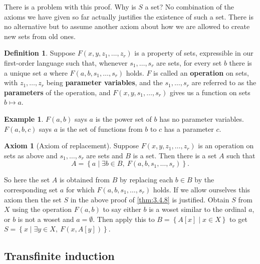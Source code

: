 \documentclass{article}
\newcommand{\rb}[1]{\left( #1 \right)}
\renewcommand{\sb}[1]{\left[ #1 \right]}
\newcommand{\cb}[1]{\left\{ #1 \right\}}
\theoremstyle{definition}\newtheorem{definition}{Definition}[subsection]
\theoremstyle{definition}\newtheorem{remark}[definition]{Remark}
\theoremstyle{definition}\newtheorem*{example}{Example}
\theoremstyle{definition}\newtheorem*{note}{Note}
\newtheorem{axiom}{Axiom}
\begin{document}

There is a problem with this proof. Why is $ S $ a set? No combination of the axioms we have given so far actually justifies the existence of such a set. There is no alternative but to assume another axiom about how we are allowed to create new sets from old ones.

\begin{definition}
Suppose $ F\rb{x, y, z_1, \dots, z_r} $ is a property of sets, expressible in our first-order language such that, whenever $ s_1, \dots, s_r $ are sets, for every set $ b $ there is a unique set $ a $ where $ F\rb{a, b, s_1, \dots, s_r} $ holds. $ F $ is called an \textbf{operation} on sets, with $ z_1, \dots, z_r $ being \textbf{parameter variables}, and the $ s_1, \dots, s_r $ are referred to as the \textbf{parameters} of the operation, and $ F\rb{x, y, s_1, \dots, s_r} $ gives us a function on sets $ b \mapsto a $.
\end{definition}

\begin{example}
$ F\rb{a, b} $ says $ a $ is the power set of $ b $ has no parameter variables. $ F\rb{a, b, c} $ says $ a $ is the set of functions from $ b $ to $ c $ has a parameter $ c $.
\end{example}

\begin{axiom}[Axiom of replacement]
Suppose $ F\rb{x, y, z_1, \dots, z_r} $ is an operation on sets as above and $ s_1, \dots, s_r $ are sets and $ B $ is a set. Then there is a set $ A $ such that
$$ A = \cb{a \mid \exists b \in B, \ F\rb{a, b, s_1, \dots, s_r}}. $$
\end{axiom}

So here the set $ A $ is obtained from $ B $ by replacing each $ b \in B $ by the corresponding set $ a $ for which $ F\rb{a, b, s_1, \dots, s_r} $ holds. If we allow ourselves this axiom then the set $ S $ in the above proof of \ref{thm:3.4.8} is justified. Obtain $ S $ from $ X $ using the operation $ F\rb{a, b} $ to say either $ b $ is a woset similar to the ordinal $ a $, or $ b $ is not a woset and $ a = \emptyset $. Then apply this to $ B = \cb{A\sb{x} \mid x \in X} $ to get $ S = \cb{x \mid \exists y \in X, \ F\rb{x, A\sb{y}}} $.

\subsection{Transfinite induction}
\end{document}

